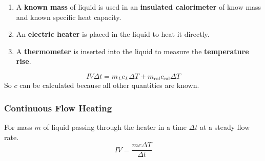 \begin{enumerate}
    \item A \textbf{known mass} of liquid is used in an \textbf{insulated calorimeter} of know mass and known specific heat capacity.
    \item An \textbf{electric heater} is placed in the liquid to heat it directly.
    \item A \textbf{thermometer} is inserted into the liquid to measure the \textbf{temperature rise}.
\end{enumerate}
$$IV\Delta t=m_Lc_L\Delta T+m_\text{cal}c_\text{cal}\Delta T$$
So $c$ can be calculated because all other quantities are known.

\subsubsection*{Continuous Flow Heating}

For mass $m$ of liquid passing through the heater in a time $\Delta t$ at a steady flow rate.
$$IV=\frac{mc\Delta T}{\Delta t}$$
